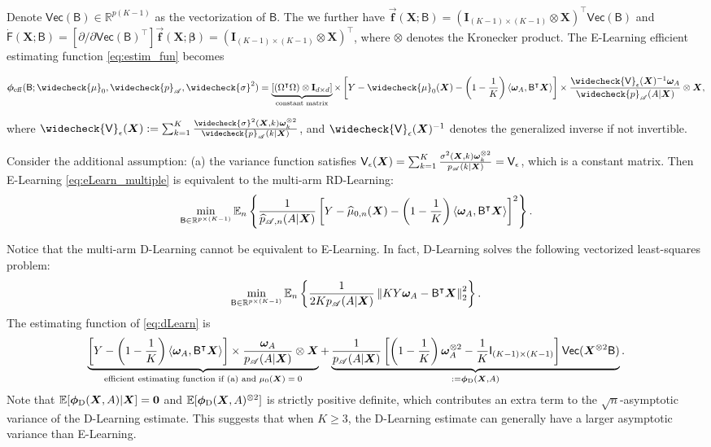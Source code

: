 \documentclass[11pt]{article}
\theoremstyle{definition}
\theoremstyle{remark}
\newcommand{\bbf}{\bm{f}}
\newcommand{\Ib}{\mathbf{I}}
\newcommand{\bX}{\bm{X}}
\newcommand{\bbeta}{\bm{\beta}}
\newcommand{\bomega}{\bm{\omega}}
\newcommand{\bphi}{\bm{\phi}}
\newcommand{\bbE}{\mathbb{E}}
\newcommand{\bbR}{\mathbb{R}}
\newcommand{\sA}{\mathscr{A}}
\newcommand{\sfB}{\mathsf{B}}
\newcommand{\sfF}{\mathsf{F}}
\newcommand{\sfI}{\mathsf{I}}
\newcommand{\sfV}{\mathsf{V}}
\newcommand{\sfvec}{\mathsf{Vec}}
\newcommand{\bzero}{\mathbf{0}}	%
\newcommand{\eff}{\mathrm{eff}}
\begin{document}
Denote $ \sfvec(\sfB) \in \bbR^{p(K-1)} $ as the vectorization of $ \sfB $. The we further have $ \vec{\bbf}(\bX;\sfB) = (\Ib_{(K-1)\times(K-1)} \otimes \bX)^{\intercal}\sfvec(\sfB) $ and $ \dot{\sfF}(\bX;\sfB) = [\partial/\partial \sfvec(\sfB)^{\intercal}]\vec{\bbf}(\bX;\bbeta) = (\Ib_{(K-1)\times(K-1)} \otimes \bX)^{\intercal} $, where $ \otimes $ denotes the Kronecker product. 
The E-Learning efficient estimating function \eqref{eq:estim_fun} becomes
\begin{small}
	\begin{align}
		\bphi_{\eff}(\sfB;\widecheck{\mu}_{0},\widecheck{p}_{\sA},\widecheck{\sigma}^{2}) = \underbrace{[(\Omega^{\intercal}\Omega)\otimes \Ib_{d\times d}]}_{\text{constant matrix}} \times \left[ Y - \widecheck{\mu}_{0}(\bX) - \left( 1 - {1 \over K} \right)\langle \bomega_{A},\sfB^{\intercal}\bX \rangle \right] \times{\widecheck{\sfV}_{\epsilon}(\bX)^{-1}\bomega_{A} \over \widecheck{p}_{\sA}(A|\bX)} \otimes \bX,\label{eq:eLearn_multiple}
	\end{align}
\end{small}%
where $ \widecheck{\sfV}_{\epsilon}(\bX) := \sum_{k=1}^{K}{\widecheck{\sigma}^{2}(\bX,k)\bomega_{k}^{\otimes 2} \over \widecheck{p}_{\sA}(k|\bX)} $, and $ \widecheck{\sfV}_{\epsilon}(\bX)^{-1} $ denotes the generalized inverse if not invertible.

Consider the additional assumption: (a) the variance function satisfies $ \sfV_{\epsilon}(\bX) = \sum_{k=1}^{K}{\sigma^{2}(\bX,k)\bomega_{k}^{\otimes 2} \over p_{\sA}(k|\bX)} = \sfV_{\epsilon} $, which is a constant matrix. Then E-Learning \eqref{eq:eLearn_multiple} is equivalent to the multi-arm RD-Learning:
\[ \min_{\sfB \in \bbR^{p\times(K-1)}}\bbE_{n}\left\{ {1 \over \widehat{p}_{\sA,n}(A|\bX)}\left[ Y - \widehat{\mu}_{0,n}(\bX) - \left( 1 - {1 \over K} \right)\langle \bomega_{A},\sfB^{\intercal}\bX \rangle \right]^{2} \right\}. \]

Notice that the multi-arm D-Learning \citep{qi2020multi} cannot be equivalent to E-Learning. In fact, D-Learning solves the following vectorized least-squares problem:
\begin{align}
	\min_{\sfB \in \bbR^{p\times(K-1)}}\bbE_{n}\left\{ {1 \over 2Kp_{\sA}(A|\bX)}\left\|KY\bomega_{A} - \sfB^{\intercal}\bX\right\|_{2}^{2} \right\}.\label{eq:dLearn}
\end{align}
The estimating function of \eqref{eq:dLearn} is
\[ \underbrace{\left[ Y - \left( 1 - {1 \over K} \right)\langle \bomega_{A},\sfB^{\intercal}\bX \rangle \right] \times {\bomega_{A} \over p_{\sA}(A|\bX)} \otimes \bX}_{\text{efficient estimating function if (a) and $ \mu_{0}(\bX) = 0 $}} + \underbrace{{1 \over p_{\sA}(A|\bX)} \left[ \left( 1 - {1 \over K} \right)\bomega_{A}^{\otimes 2} - {1 \over K}\sfI_{(K-1)\times(K-1)} \right]\sfvec(\bX^{\otimes 2}\sfB)}_{:= \bphi_{\rm D}(\bX,A)}. \]
Note that $ \bbE[\bphi_{\rm D}(\bX,A)|\bX] = \bzero $ and $ \bbE[\bphi_{\rm D}(\bX,A)^{\otimes 2}] $ is strictly positive definite, which contributes an extra term to the $ \sqrt{n} $-asymptotic variance of the D-Learning estimate. This suggests that when $ K \ge 3 $, the D-Learning estimate can generally have a larger asymptotic variance than E-Learning.
\end{document}
